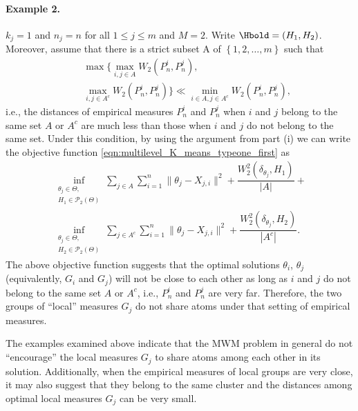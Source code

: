 \paragraph{Example 2.} $k_{j}=1$ and $n_{j}=n$ for all $1 \leq  j \leq m$ and $M=2$. 
Write $\Hbold = (H_1,H_2)$.
Moreover, assume that there is a strict subset A of $\left\{1,2,\ldots,m\right\}$ 
such that 
\vspace{-6pt}
\begin{eqnarray}
& & \mathop {\max }\biggr\{\mathop {\max }\limits_{i, j \in A}{W_{2}(P_{n}^{i},P_{n}^{j})}, \nonumber \\
& & \mathop {\max }\limits_{i, j \in A^{c}}{W_{2}(P_{n}^{i},P_{n}^{j})}\biggr\} \ll \mathop {\min }\limits_{i \in A, j \in A^{c}}{W_{2}(P_{n}^{i},P_{n}^{j})}, \nonumber 
\end{eqnarray}
i.e., the distances of empirical measures $P_{n}^{i}$ and $P_{n}^{j}$ when $i$ and $j$ 
belong to the same set $A$ or $A^{c}$ are much less than those when $i$ and $j$ do not 
belong to the same set. Under this condition, by using the argument from part (i) we can write 
the objective function \eqref{eqn:multilevel_K_means_typeone_first} as 
\vspace{-6pt}
\begin{eqnarray}
\mathop {\inf }\limits_{\substack {\theta_{j} \in \Theta, \\ H_{1} \in \mathcal{P}_{2}(\Theta)}}{\sum \limits_{j \in A}{\sum \limits_{i=1}^{n}{\|\theta_{j}-X_{j,i}\|^{2}}}+\dfrac{W_{2}^{2}(\delta_{\theta_{j}},H_{1})}{|A|}}+ \nonumber \\ 
\mathop {\inf }\limits_{\substack {\theta_{j} \in \Theta, \\ H_{2} \in \mathcal{P}_{2}(\Theta)}}{\sum \limits_{j \in A^{c}}{\sum \limits_{i=1}^{n}{\|\theta_{j}-X_{j,i}\|^{2}}}+\dfrac{W_{2}^{2}(\delta_{\theta_{j}},H_{2})}{|A^{c}|}}. \nonumber
\end{eqnarray}
The above objective function suggests that the optimal solutions $\theta_{i}$, $\theta_{j}$ 
(equivalently, $G_{i}$ and $G_{j}$) will not be close to each other as long as $i$ and 
$j$ do not belong to the same set $A$ or $A^{c}$, i.e., $P_{n}^{i}$ and $P_{n}^{j}$ are 
very far. Therefore, the two groups of ``local'' measures $G_{j}$ do not share atoms under that 
setting of empirical measures.

The examples examined above indicate that the MWM problem in general
do not ``encourage'' the local measures $G_{j}$ to share atoms among each other in its solution. Additionally, 
when the empirical measures of local groups are very close, it may also suggest that they 
belong to the same cluster and the distances among optimal local measures $G_{j}$ can be 
very small. 

